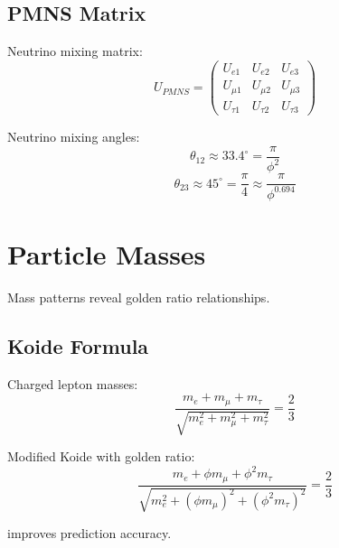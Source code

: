 \subsection{PMNS Matrix}

\begin{definition}
\label{def:pmns}
Neutrino mixing matrix:
\begin{equation}
U_{PMNS} = \begin{pmatrix}
U_{e1} & U_{e2} & U_{e3} \\
U_{\mu1} & U_{\mu2} & U_{\mu3} \\
U_{\tau1} & U_{\tau2} & U_{\tau3}
\end{pmatrix}
\end{equation}
\end{definition}

\begin{proposition}
\label{prop:pmns-golden}
Neutrino mixing angles:
\begin{equation}
\theta_{12} \approx 33.4^\circ = \frac{\pi}{\phi^2}
\end{equation}
\begin{equation}
\theta_{23} \approx 45^\circ = \frac{\pi}{4} \approx \frac{\pi}{\phi^{0.694}}
\end{equation}
\end{proposition}

\section{Particle Masses}

Mass patterns reveal golden ratio relationships.

\subsection{Koide Formula}

\begin{definition}
\label{def:koide}
Charged lepton masses:
\begin{equation}
\frac{m_e + m_\mu + m_\tau}{\sqrt{m_e^2 + m_\mu^2 + m_\tau^2}} = \frac{2}{3}
\end{equation}
\end{definition}

\begin{proposition}
\label{prop:golden-koide}
Modified Koide with golden ratio:
\begin{equation}
\frac{m_e + \phi m_\mu + \phi^2 m_\tau}{\sqrt{m_e^2 + (\phi m_\mu)^2 + (\phi^2 m_\tau)^2}} = \frac{2}{3}
\end{equation}

improves prediction accuracy.
\end{proposition}

